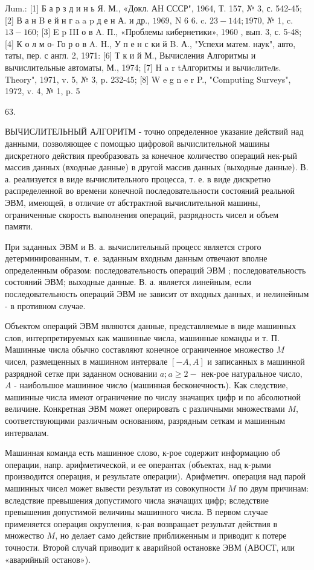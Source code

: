 \documentclass[10pt]{article}
\begin{document}
Лum.: [1] Б а р з д и н ь Я. М., «Докл. АН СССР", 1964, Т. 157, № 3, с. 542-45; [2] В а н B е й н г a a p д е н А. и др., $1969, \mathrm{~N}$ 6 6. c. $23-144 ; 1970$, № 1, c. $13-160$; [3] E p III о в A. П., «Проблемы кибернетики», 1960 , вып. 3, с. 5-48; [4] К о л м о- Го р о в A. H., У $п$ е н с ки й B. А., "Успехи матем. наук", авто, таты, пер. с англ. 2, 1971: [6] Т к и й М., Вычисления Алгоритмы и вычислительные автоматы, М., 1974; [7] H a r tAлгоритмы и вычиcлитeлs. Theory", 1971, v. 5, № 3, p. 232-45; [8] W e g n e r P., "Computing Surveys", 1972, v. 4, № 1, p. 5

63.



ВЫЧИСЛИТЕЛЬНЫЙ АЛГОРИТМ - точно определенное указание действий над данными, позволяющее с помощью цифровой вычислительной машины дискретного действия преобразовать за конечное количество операций нек-рый массив данных (входные данные) в другой массив данных (выходные данные). В. а. реализуется в виде вычислительного процесса, т. е. в виде дискретно распределенной во времени конечной последовательности состояний реальной ЭВМ, имеющей, в отличие от абстрактной вычислительной машины, ограниченные скорость выполнения операций, разрядность чисел и объем памяти.



При заданных ЭВМ и В. а. вычислительный процесс является строго детерминированным, т. е. заданным входным данным отвечают вполне определенным образом: последовательность операций ЭВМ ; последовательность состояний ЭВМ; выходные данные. В. а. является линейным, если последовательность операций ЭВМ не зависит от входных данных, и нелинейным - в противном случае.



Объектом операций ЭВМ являются данные, представляемые в виде машинных слов, интерпретируемых как машинные числа, машинные команды и т. П. Машинные числа обычно составляют конечное ограниченное множество $M$ чисел, размещенных в машинном интервале $[-A, A]$ и записанных в машинной разрядной сетке при заданном основании $a ; a \geqslant 2-$ нек-рое натуральное число, $A$ - наибольшое машинное число (машинная бесконечность). Как следствие, машинные числа имеют ограничение по числу значащих цифр и по абсолютной величине. Конкретная ЭВМ может оперировать с различными множествами $M$, соответствующими различным основаниям, разрядным сеткам и машинным интервалам.



Машинная команда есть машинное слово, к-рое содержит информацию об операции, напр. арифметической, и ее оперантах (объектах, над к-рыми производится операция, и результате операции). Арифметич. операция над парой машинных чисел может вывести результат из совокупности $M$ по двум причинам: вследствие превышения допустимого числа значащих цифр; вследствие превышения допустимой величины машинного числа. В первом случае применяется операция округления, к-рая возвращает результат действия в множество $M$, но делает само действие приближенным и приводит к потере точности. Второй случай приводит к аварийной остановке ЭВМ (АВОСТ, или «аварийный останов»).
\end{document}

